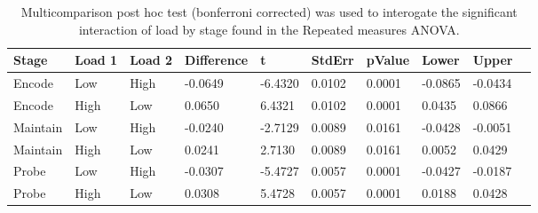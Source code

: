 \begin{table}
\centering
\begin{tabular}[0.2em]{@{}llllllllll@{}}\toprule
Stage & Load 1 & Load 2 & Difference & t & StdErr & pValue & Lower & Upper\\\toprule[0.2em]
Encode & Low & High & -0.0649 & -6.4320 & 0.0102 & 0.0001 & -0.0865 & -0.0434 \\\midrule
Encode & High & Low & 0.0650 & 6.4321 & 0.0102 & 0.0001 & 0.0435 & 0.0866 \\\midrule
Maintain & Low & High & -0.0240 & -2.7129 & 0.0089 & 0.0161 & -0.0428 & -0.0051 \\\midrule
Maintain & High & Low & 0.0241 & 2.7130 & 0.0089 & 0.0161 & 0.0052 & 0.0429 \\\midrule
Probe & Low & High & -0.0307 & -5.4727 & 0.0057 & 0.0001 & -0.0427 & -0.0187 \\\midrule
Probe & High & Low & 0.0308 & 5.4728 & 0.0057 & 0.0001 & 0.0188 & 0.0428 \\\bottomrule[0.2em]
\end{tabular}
\caption{Multicomparison post hoc test (bonferroni corrected) was used to interogate the significant interaction of load by stage found in the Repeated measures ANOVA.\label{tabel:tbl_RMAAFC2_PH_inter}}
\end{table}
